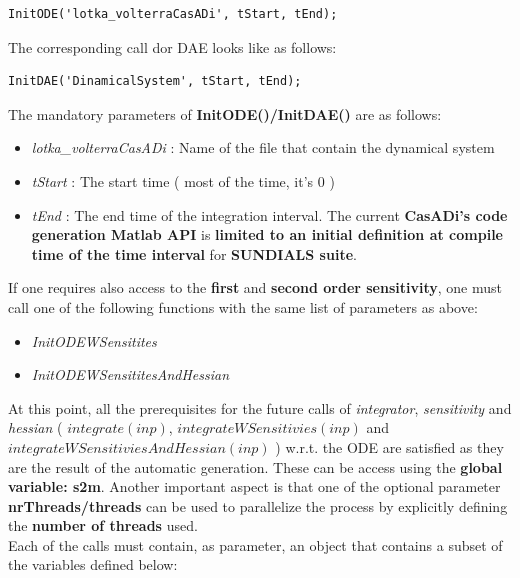 \documentclass[12pt, letterpaper]{article}
\begin{document}
\begin{lstlisting}
InitODE('lotka_volterraCasADi', tStart, tEnd);
\end{lstlisting}

The corresponding call dor DAE looks like as follows:
\begin{lstlisting}
InitDAE('DinamicalSystem', tStart, tEnd);
\end{lstlisting}

The mandatory parameters of \textbf{InitODE()/InitDAE()} are as follows: 

\begin{itemize}
	\item \textit{lotka\_volterraCasADi} : Name of the file that contain the dynamical system
	\item \textit{tStart} : The start time ( most of the time, it's $0$ )
	\item \textit{tEnd} : The end time of the integration interval. The current \textbf{ CasADi's code generation Matlab API} is \textbf{limited to an initial definition at compile time of the time interval} for \textbf{SUNDIALS suite}.
\end{itemize}

If one requires also access to the \textbf{ first} and \textbf{second order sensitivity}, one must call one of the following functions with the same list of parameters as above:
\begin{itemize}
	\item \textit{InitODEWSensitites}
	\item \textit{InitODEWSensititesAndHessian}
\end{itemize}


At this point, all the prerequisites for the future calls of \textit{integrator}, \textit{sensitivity} and \textit{hessian} ( $integrate(inp)$, $integrateWSensitivies(inp)$ and  $integrateWSensitiviesAndHessian(inp)$ ) w.r.t. the ODE are satisfied as they are the result of the automatic generation. These can be access using the \textbf{global variable: s2m}. Another important aspect is that one of the optional parameter \textbf{nrThreads/threads} can be used to parallelize the process by explicitly defining the \textbf{ number of threads} used. \\ 

Each of the calls must contain, as parameter, an object that contains a subset of the variables defined below:
\end{document}
